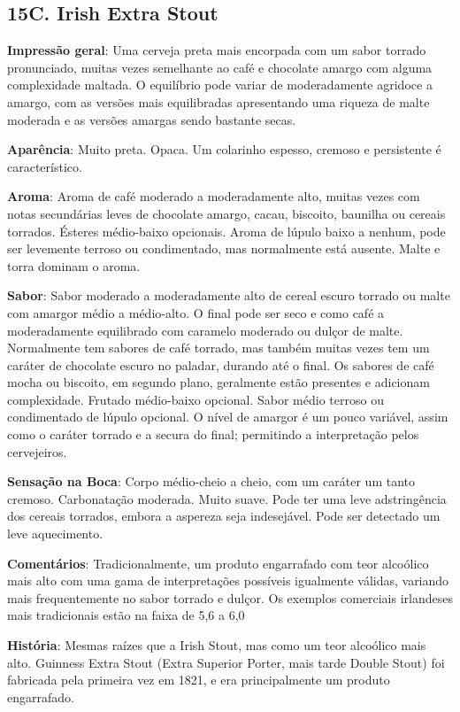 \subsection*{15C. Irish Extra Stout}

\textbf{Impressão geral}: Uma cerveja preta mais encorpada com um sabor torrado pronunciado, muitas vezes semelhante ao café e chocolate amargo com alguma complexidade maltada. O equilíbrio pode variar de moderadamente agridoce a amargo, com as versões mais equilibradas apresentando uma riqueza de malte moderada e as versões amargas sendo bastante secas.

\textbf{Aparência}: Muito preta. Opaca. Um colarinho espesso, cremoso e persistente é característico.

\textbf{Aroma}: Aroma de café moderado a moderadamente alto, muitas vezes com notas secundárias leves de chocolate amargo, cacau, biscoito, baunilha ou cereais torrados. Ésteres médio-baixo opcionais. Aroma de lúpulo baixo a nenhum, pode ser levemente terroso ou condimentado, mas normalmente está ausente. Malte e torra dominam o aroma.

\textbf{Sabor}: Sabor moderado a moderadamente alto de cereal escuro torrado ou malte com amargor médio a médio-alto. O final pode ser seco e como café a moderadamente equilibrado com caramelo moderado ou dulçor de malte. Normalmente tem sabores de café torrado, mas também muitas vezes tem um caráter de chocolate escuro no paladar, durando até o final. Os sabores de café mocha ou biscoito, em segundo plano, geralmente estão presentes e adicionam complexidade. Frutado médio-baixo opcional. Sabor médio terroso ou condimentado de lúpulo opcional. O nível de amargor é um pouco variável, assim como o caráter torrado e a secura do final; permitindo a interpretação pelos cervejeiros.

\textbf{Sensação na Boca}: Corpo médio-cheio a cheio, com um caráter um tanto cremoso. Carbonatação moderada. Muito suave. Pode ter uma leve adstringência dos cereais torrados, embora a aspereza seja indesejável. Pode ser detectado um leve aquecimento.

\textbf{Comentários}: Tradicionalmente, um produto engarrafado com teor alcoólico mais alto com uma gama de interpretações possíveis igualmente válidas, variando mais frequentemente no sabor torrado e dulçor. Os exemplos comerciais irlandeses mais tradicionais estão na faixa de 5,6 a 6,0%

\textbf{História}: Mesmas raízes que a Irish Stout, mas como um teor alcoólico mais alto. Guinness Extra Stout (Extra Superior Porter, mais tarde Double Stout) foi fabricada pela primeira vez em 1821, e era principalmente um produto engarrafado.

